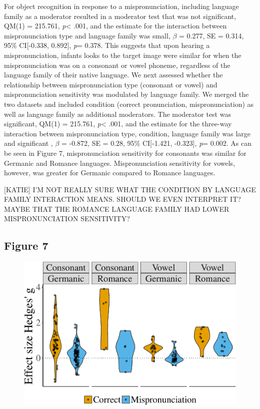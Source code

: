 \documentclass[man]{apa6}
\theoremstyle{definition}
\theoremstyle{definition}
\theoremstyle{definition}
\theoremstyle{remark}
\begin{document}
For object recognition in response to a mispronunciation, including
language family as a moderator resulted in a moderator test that was not
significant, QM(1) = 215.761, \emph{p}\textless{} .001, and the estimate
for the interaction between mispronunciation type and language family
was small, \(\beta\) = 0.277, SE = 0.314, 95\% CI{[}-0.338, 0.892{]},
\emph{p}= 0.378. This suggests that upon hearing a mispronunciation,
infants looks to the target image were similar for when the
mispronunciation was on a consonant or vowel phoneme, regardless of the
language family of their native language. We next assessed whether the
relationship between mispronunciation type (consonant or vowel) and
mispronunciation sensitivity was modulated by language family. We merged
the two datasets and included condition (correct pronunciation,
mispronunciation) as well as language family as additional moderators.
The moderator test was significant, QM(1) = 215.761, \emph{p}\textless{}
.001, and the estimate for the three-way interaction between
mispronunciation type, condition, language family was large and
significant , \(\beta\) = -0.872, SE = 0.28, 95\% CI{[}-1.421,
-0.323{]}, \emph{p}= 0.002. As can be seen in Figure 7, mispronunciation
sensitivity for consonants was similar for Germanic and Romance
languages. Mispronunciation sensitivity for vowels, however, was greater
for Germanic compared to Romance languages.

{[}KATIE{]} I'M NOT REALLY SURE WHAT THE CONDITION BY LANGUAGE FAMILY
INTERACTION MEANS. SHOULD WE EVEN INTERPRET IT? MAYBE THAT THE ROMANCE
LANGUAGE FAMILY HAD LOWER MISPRONUNCIATION SENSITIVITY?

\subsection{Figure 7}\label{figure-7}

\begin{figure}[htbp]
\centering
\includegraphics{Paper_Analyses_files/figure-latex/PlotCVEffect_Lang-1.pdf}
\caption{}
\end{figure}
\end{document}
